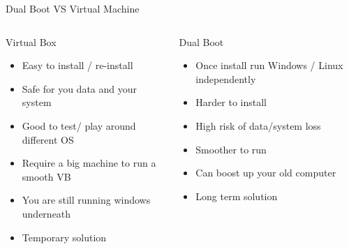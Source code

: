 \documentclass{beamer}
\begin{document}
\begin{frame}{Dual Boot VS Virtual Machine}
\begin{columns}
\begin{column}{6cm}
\begin{center}
Virtual Box
\end{center}
\begin{itemize}
\item Easy to install / re-install
\item Safe for you data and your system
\item Good to test/ play around different OS
\item Require a big machine to run a smooth VB
\item You are still running windows underneath
\item Temporary solution
\end{itemize}
\end{column}
\begin{column}{6cm}
\begin{center}
Dual Boot
\end{center}
\begin{itemize}
\item Once install run Windows / Linux independently
\item Harder to install
\item High risk of data/system loss
\item Smoother to run
\item Can boost up your old computer
\item Long term solution
\end{itemize}
\end{column}
\end{columns}
\end{frame}
\end{document}
